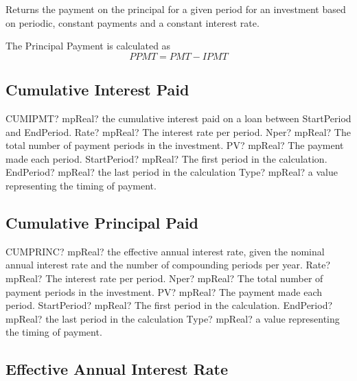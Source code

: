 \vspace{0.3cm}
Returns the payment on the principal for a given period for an investment based on periodic, constant payments and a constant interest rate.

The Principal Payment is calculated as
\begin{equation}
	PPMT = PMT - IPMT 
\end{equation}




\subsection{Cumulative Interest Paid}

\begin{mpFunctionsExtract}
	\mpWorksheetFunctionSixNotImplemented
	{CUMIPMT? mpReal? the cumulative interest paid on a loan between StartPeriod and EndPeriod.}
	{Rate? mpReal? The interest rate per period.}
	{Nper? mpReal? The total number of payment periods in the investment.}
	{PV? mpReal? The payment made each period.}
	{StartPeriod? mpReal? The first period in the calculation.}
	{EndPeriod? mpReal? the last period in the calculation}
	{Type? mpReal? a value representing the timing of payment.}
\end{mpFunctionsExtract}





\subsection{Cumulative Principal Paid}

\begin{mpFunctionsExtract}
	\mpWorksheetFunctionSixNotImplemented
	{CUMPRINC? mpReal? the effective annual interest rate, given the nominal annual interest rate and the number of compounding periods per year.}
	{Rate? mpReal? The interest rate per period.}
	{Nper? mpReal? The total number of payment periods in the investment.}
	{PV? mpReal? The payment made each period.}
	{StartPeriod? mpReal? The first period in the calculation.}
	{EndPeriod? mpReal? the last period in the calculation}
	{Type? mpReal? a value representing the timing of payment.}
\end{mpFunctionsExtract}




\subsection{Effective Annual Interest Rate}

